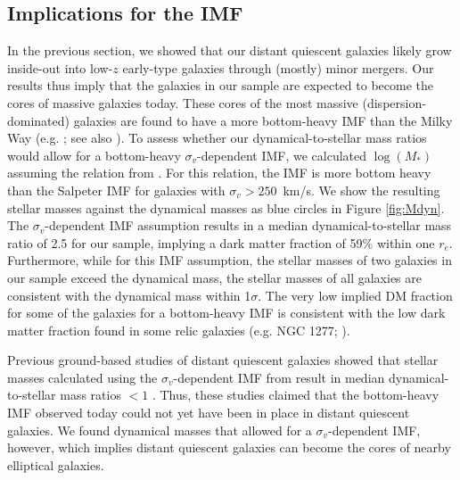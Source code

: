 \documentclass{aa}
\begin{document}
\subsection{Implications for the IMF}\label{sec:discussion_mdyn}
In the previous section, we showed that our distant quiescent galaxies likely grow inside-out into low-$z$ early-type galaxies through (mostly) minor mergers. Our results thus imply that the galaxies in our sample are expected to become the cores of massive galaxies today. These cores of the most massive (dispersion-dominated) galaxies are found to have a more bottom-heavy IMF than the Milky Way (e.g. \citealt{TTreu2010, CConroy2012, MCappellari2012,CTortora2013,HLi2017}; see also \citealt{IMartinNavarro2018}). To assess whether our dynamical-to-stellar mass ratios would allow for a bottom-heavy $\sigma_{v}$-dependent IMF, we calculated $\log(M_*)$ assuming the relation from \citet{TTreu2010}. For this relation, the IMF is more bottom heavy than the Salpeter IMF for galaxies with $\sigma_{v}>250$~km/s. We show the resulting stellar masses against the dynamical masses as blue circles in Figure \ref{fig:Mdyn}. The $\sigma_{v}$-dependent IMF assumption results in a median dynamical-to-stellar mass ratio of 2.5 for our sample, implying a dark matter fraction of 59\% within one $r_e$. Furthermore, while for this IMF assumption, the stellar masses of two galaxies in our sample exceed the dynamical mass, the stellar masses of all galaxies are consistent with the dynamical mass within 1$\sigma$. The very low implied DM fraction for some of the galaxies for a bottom-heavy IMF is consistent with the low dark matter fraction found in some relic galaxies (e.g. NGC 1277; \citealt{SComeron2023}).

Previous ground-based studies of distant quiescent galaxies showed that stellar masses calculated using the $\sigma_{v}$-dependent IMF from \citet{TTreu2010} result in median dynamical-to-stellar mass ratios $<1$ \citep{JMendel2020,MKriek2024, BForrest2022}. Thus, these studies claimed that the bottom-heavy IMF observed today could not yet have been in place in distant quiescent galaxies. We found dynamical masses that allowed for a $\sigma_v$-dependent IMF, however, which implies distant quiescent galaxies can become the cores of nearby elliptical galaxies.
\end{document}
